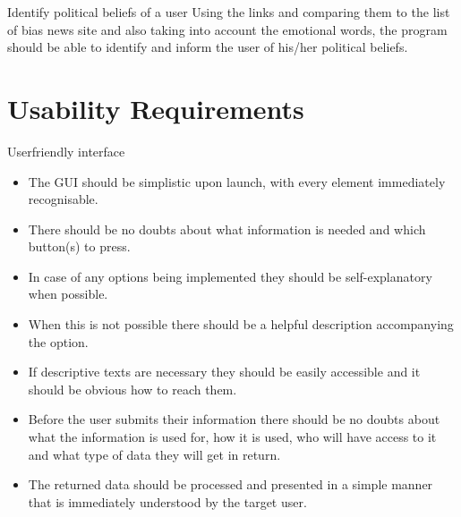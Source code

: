 \begin{requirement}{Identify political beliefs of a user }
Using the links and comparing them to the list of bias news site and also taking
into account the emotional words, the program should be able to identify and
inform the user of his/her political beliefs. 
\end{requirement}



\section{Usability Requirements}

\begin{requirement}{Userfriendly interface}
\begin{itemize}
  \item The \ac{GUI} should be simplistic upon launch, with every element immediately recognisable.
  \item There should be no doubts about what information is needed and which button(s) to press.
  \item In case of any options being implemented they should be self-explanatory when possible.
  \item When this is not possible there should be a helpful description accompanying the option.
  \item If descriptive texts are necessary they should be easily accessible and it should be obvious how to reach them.
  \item Before the user submits their information there should be no doubts about what the information is used for, how
        it is used, who will have access to it and what type of data they will get in return.
  \item The returned data should be processed and presented in a simple manner that is immediately understood by the
        target user.
\end{itemize}
\end{requirement}
